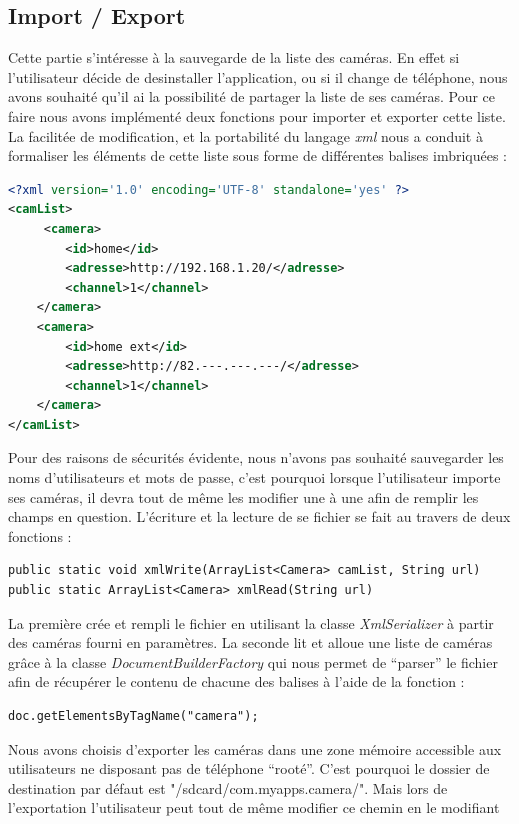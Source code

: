 \subsection{Import / Export}
Cette partie s'intéresse à la sauvegarde de la liste des caméras. En effet si
l'utilisateur décide de desinstaller l'application, ou si il change de
téléphone, nous avons souhaité qu'il ai la possibilité de partager la liste de
ses caméras. Pour ce faire nous avons implémenté deux fonctions pour importer et
exporter cette liste.\newline
La facilitée de modification, et la portabilité du langage \textit{xml} nous a
conduit à formaliser les éléments de cette liste sous forme de différentes
balises imbriquées :
\begin{lstlisting}[language=XML, format=XML]
<?xml version='1.0' encoding='UTF-8' standalone='yes' ?> 
<camList>
   	 <camera> 
   		<id>home</id>
  		<adresse>http://192.168.1.20/</adresse> 
  		<channel>1</channel> 
  	</camera> 
  	<camera> 
   		<id>home ext</id>
  		<adresse>http://82.---.---.---/</adresse> 
  		<channel>1</channel> 
  	</camera> 
</camList>
\end{lstlisting}
Pour des raisons de sécurités évidente, nous n'avons pas souhaité sauvegarder
les noms d'utilisateurs et mots de passe, c'est pourquoi lorsque l'utilisateur
importe ses caméras, il devra tout de même les modifier une à une afin de
remplir les champs en question.\newline
\indent L'écriture et la lecture de se fichier se fait au travers de deux fonctions
:
\begin{lstlisting}
public static void xmlWrite(ArrayList<Camera> camList, String url)
public static ArrayList<Camera> xmlRead(String url)
\end{lstlisting}
La première crée et rempli le fichier en utilisant la classe
\textit{XmlSerializer} à partir des caméras fourni en paramètres.
La seconde lit et alloue une liste de caméras grâce à la classe
\textit{DocumentBuilderFactory} qui nous permet de ``parser'' le fichier afin de
récupérer le contenu de chacune des balises à l'aide de la fonction :
\begin{lstlisting}
doc.getElementsByTagName("camera");
\end{lstlisting}
\indent Nous avons choisis d'exporter les caméras dans une zone mémoire
accessible aux utilisateurs ne disposant pas de téléphone ``rooté''. C'est pourquoi le dossier
de destination par défaut est "/sdcard/com.myapps.camera/". Mais lors de
l'exportation l'utilisateur peut tout de même modifier ce chemin en le modifiant
